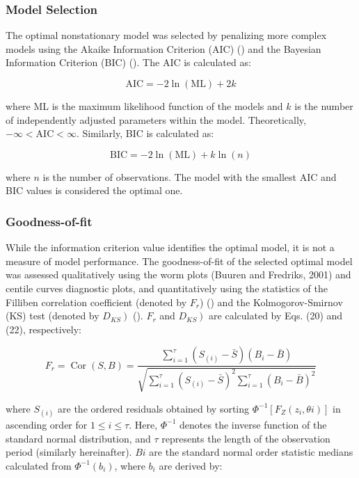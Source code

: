 \documentclass[
]{krantz}
\begin{document}
\subsubsection{Model Selection}\label{model-selection}

The optimal nonstationary model was selected by penalizing more complex models using the Akaike Information Criterion (AIC) (\citet{Akaike1974}) and the Bayesian Information Criterion (BIC) (\citet{Schwarz1978}). The AIC is calculated as:

\[
\mathrm{AIC}=-2 \ln (\mathrm{ML})+2 k \tag{18}
\]

where ML is the maximum likelihood function of the models and \(k\) is the number of independently adjusted parameters within the model. Theoretically, \(-\infty < \mathrm{AIC} < \infty\). Similarly, BIC is calculated as:

\[
\mathrm{BIC}=-2 \ln (\mathrm{ML})+k \ln(n) \tag{19}
\]

where \(n\) is the number of observations. The model with the smallest AIC and BIC values is considered the optimal one.

\subsubsection{Goodness-of-fit}\label{goodness-of-fit}

While the information criterion value identifies the optimal model, it is not a measure of model performance. The goodness-of-fit of the selected optimal model was assessed qualitatively using the worm plots (Buuren and Fredriks, 2001) and centile curves diagnostic plots, and quantitatively using the statistics of the Filliben correlation coefficient (denoted by \(F_{r}\)) (\citet{Filliben1975}) and the Kolmogorov-Smirnov (KS) test (denoted by \(\left.D_{KS}\right)\) (\citet{Massey1951}). \(F_{r}\) and \(\left.D_{KS}\right)\) are calculated by Eqs. (20) and (22), respectively:

\[
F_{r}=\operatorname{Cor}(S, B)=\frac{\sum_{i=1}^{\tau}\left(S_{(i)}-\bar{S}\right)\left(B_{i}-\bar{B}\right)}{\sqrt{\sum_{i=1}^{\tau}\left(S_{(i)}-\bar{S}\right)^{2} \sum_{i=1}^{\tau}\left(B_{i}-\bar{B}\right)^{2}}} \tag{20}
\]

where \(S_{(i)}\) are the ordered residuals obtained by sorting \(\Phi^{-1}\left[F_{Z}\left(z_{i}, {\theta}{i}\right)\right]\) in ascending order for \(1 \leqslant i \leqslant \tau\). Here, \(\Phi^{-1}\) denotes the inverse function of the standard normal distribution, and \(\tau\) represents the length of the observation period (similarly hereinafter). \(B{i}\) are the standard normal order statistic medians calculated from \(\Phi^{-1}\left(b_{i}\right)\), where \(b_{i}\) are derived by:
\end{document}
